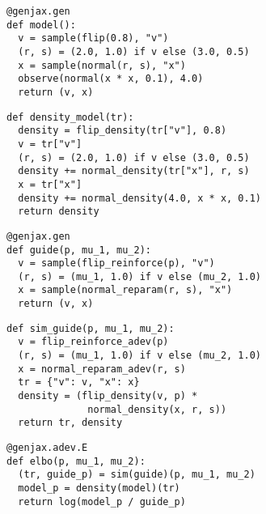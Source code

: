 \documentclass{article}
\begin{document}
\begin{verbatim}
@genjax.gen
def model():
  v = sample(flip(0.8), "v")
  (r, s) = (2.0, 1.0) if v else (3.0, 0.5)
  x = sample(normal(r, s), "x")
  observe(normal(x * x, 0.1), 4.0)
  return (v, x)
\end{verbatim}

\begin{verbatim}
def density_model(tr):
  density = flip_density(tr["v"], 0.8)
  v = tr["v"]
  (r, s) = (2.0, 1.0) if v else (3.0, 0.5)
  density += normal_density(tr["x"], r, s)
  x = tr["x"]
  density += normal_density(4.0, x * x, 0.1)
  return density
\end{verbatim}

\begin{verbatim}
@genjax.gen
def guide(p, mu_1, mu_2):
  v = sample(flip_reinforce(p), "v")
  (r, s) = (mu_1, 1.0) if v else (mu_2, 1.0)
  x = sample(normal_reparam(r, s), "x")
  return (v, x)
\end{verbatim}

\begin{verbatim}
def sim_guide(p, mu_1, mu_2):
  v = flip_reinforce_adev(p)
  (r, s) = (mu_1, 1.0) if v else (mu_2, 1.0)
  x = normal_reparam_adev(r, s)
  tr = {"v": v, "x": x}
  density = (flip_density(v, p) * 
              normal_density(x, r, s))
  return tr, density
\end{verbatim}

\begin{verbatim}
@genjax.adev.E
def elbo(p, mu_1, mu_2):
  (tr, guide_p) = sim(guide)(p, mu_1, mu_2)
  model_p = density(model)(tr)
  return log(model_p / guide_p)
\end{verbatim}
\end{document}
